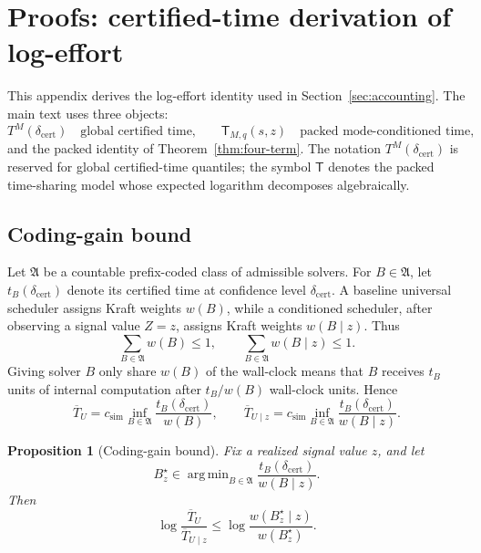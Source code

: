 \documentclass{article}
\newtheorem{proposition}{Proposition}
\DeclareMathOperator*{\argmin}{arg\,min}
\begin{document}
\clearpage



\clearpage

\appendix



\clearpage
\section{Proofs: certified-time derivation of log-effort}
\label{app:proofs}
\label{app:certified-log-effort}

This appendix derives the log-effort identity used in Section~\ref{sec:accounting}.
The main text uses three objects:
\[
    T^M(\delta_{\mathrm{cert}})
    \quad\text{global certified time,}
    \qquad
    \mathsf T_{M,q}(s,z)
    \quad\text{packed mode-conditioned time,}
\]
and the packed identity of Theorem~\ref{thm:four-term}.
The notation \(T^M(\delta_{\mathrm{cert}})\) is reserved for global certified-time quantiles; the symbol
\(\mathsf T\) denotes the packed time-sharing model whose expected logarithm decomposes
algebraically.

\subsection{Coding-gain bound}

Let \(\mathfrak A\) be a countable prefix-coded class of admissible solvers.  For
\(B\in\mathfrak A\), let \(t_B(\delta_{\mathrm{cert}})\) denote its certified time at
confidence level \(\delta_{\mathrm{cert}}\).  A baseline universal scheduler assigns Kraft
weights \(w(B)\), while a conditioned scheduler, after observing a signal value \(Z=z\),
assigns Kraft weights \(w(B\mid z)\).  Thus
\[
    \sum_{B\in\mathfrak A}w(B)\le 1,
    \qquad
    \sum_{B\in\mathfrak A}w(B\mid z)\le 1.
\]
Giving solver \(B\) only share \(w(B)\) of the wall-clock means that \(B\) receives
\(t_B\) units of internal computation after \(t_B/w(B)\) wall-clock units.  Hence
\[
    \overline T_U
    =
    c_{\mathrm{sim}}
    \inf_{B\in\mathfrak A}
    \frac{t_B(\delta_{\mathrm{cert}})}{w(B)},
    \qquad
    \overline T_{U\mid z}
    =
    c_{\mathrm{sim}}
    \inf_{B\in\mathfrak A}
    \frac{t_B(\delta_{\mathrm{cert}})}{w(B\mid z)}.
\]

\begin{proposition}[Coding-gain bound]
\label{prop:app-coding-gain}
Fix a realized signal value \(z\), and let
\[
    B_z^\star
    \in
    \argmin_{B\in\mathfrak A}
    \frac{t_B(\delta_{\mathrm{cert}})}{w(B\mid z)}.
\]
Then
\[
    \log\frac{\overline T_U}{\overline T_{U\mid z}}
    \le
    \log\frac{w(B_z^\star\mid z)}{w(B_z^\star)}.
\]
\end{proposition}
\end{document}
